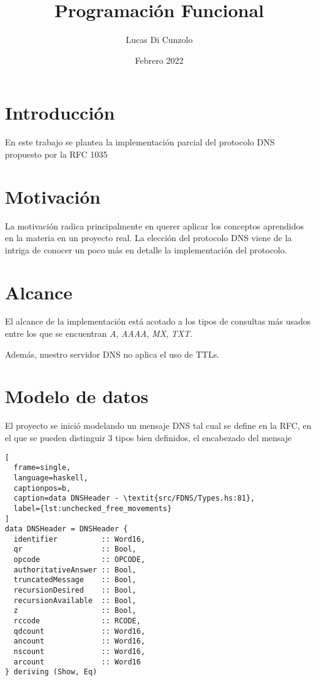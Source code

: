 \documentclass{article}
\title{Programación Funcional}
\author{Lucas Di Cunzolo}
\date{Febrero 2022}
\begin{document}
\maketitle

\section{Introducción}

En este trabajo se plantea la implementación parcial del protocolo DNS propuesto
por la RFC 1035 \cite{rfc1035}

\section{Motivación}

La motivación radica principalmente en querer aplicar los conceptos aprendidos en
la materia en un proyecto real. La elección del protocolo DNS viene de la intriga
de conocer un poco más en detalle la implementación del protocolo.

\section{Alcance}

El alcance de la implementación está acotado a los tipos de consultas más usados
entre los que se encuentran \textit{A}, \textit{AAAA}, \textit{MX}, \textit{TXT}.

Además, nuestro servidor DNS no aplica el uso de TTLs.

\section{Modelo de datos}

El proyecto se inició modelando un mensaje DNS tal cual se define en la RFC, en
el que se pueden distinguir 3 tipos bien definidos, el encabezado del mensaje

\clearpage

\begin{lstlisting}[
  frame=single,
  language=haskell,
  captionpos=b,
  caption=data DNSHeader - \textit{src/FDNS/Types.hs:81},
  label={lst:unchecked_free_movements}
]
data DNSHeader = DNSHeader {
  identifier          :: Word16,
  qr                  :: Bool,
  opcode              :: OPCODE,
  authoritativeAnswer :: Bool,
  truncatedMessage    :: Bool,
  recursionDesired    :: Bool,
  recursionAvailable  :: Bool,
  z                   :: Bool,
  rccode              :: RCODE,
  qdcount             :: Word16,
  ancount             :: Word16,
  nscount             :: Word16,
  arcount             :: Word16
} deriving (Show, Eq)
\end{lstlisting}
\end{document}
